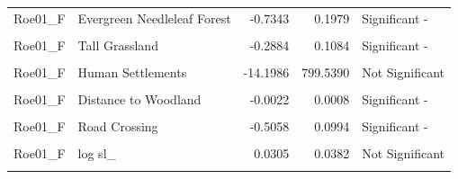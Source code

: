 \documentclass[10pt,a4paper]{article}
\begin{document}
\begin{longtable}[t]{llrrl}
Roe01\_F & Evergreen Needleleaf Forest & -0.7343 & 0.1979 & Significant -\\
\addlinespace
\cellcolor{gray!10}{Roe01\_F} & \cellcolor{gray!10}{Cropland} & \cellcolor{gray!10}{-0.8570} & \cellcolor{gray!10}{0.1910} & \cellcolor{gray!10}{Significant -}\\
Roe01\_F & Tall Grassland & -0.2884 & 0.1084 & Significant -\\
\cellcolor{gray!10}{Roe01\_F} & \cellcolor{gray!10}{Permanent Wetland} & \cellcolor{gray!10}{-13.9667} & \cellcolor{gray!10}{2427.6590} & \cellcolor{gray!10}{Not Significant}\\
Roe01\_F & Human Settlements & -14.1986 & 799.5390 & Not Significant\\
\cellcolor{gray!10}{Roe01\_F} & \cellcolor{gray!10}{Other} & \cellcolor{gray!10}{-14.3647} & \cellcolor{gray!10}{1424.3502} & \cellcolor{gray!10}{Not Significant}\\
\addlinespace
Roe01\_F & Distance to Woodland & -0.0022 & 0.0008 & Significant -\\
\cellcolor{gray!10}{Roe01\_F} & \cellcolor{gray!10}{Distance to Hedges} & \cellcolor{gray!10}{0.0013} & \cellcolor{gray!10}{0.0003} & \cellcolor{gray!10}{Significant +}\\
Roe01\_F & Road Crossing & -0.5058 & 0.0994 & Significant -\\
\cellcolor{gray!10}{Roe01\_F} & \cellcolor{gray!10}{sl\_} & \cellcolor{gray!10}{0.0007} & \cellcolor{gray!10}{0.0002} & \cellcolor{gray!10}{Significant +}\\
Roe01\_F & log sl\_ & 0.0305 & 0.0382 & Not Significant\\
\addlinespace
\cellcolor{gray!10}{Roe01\_F} & \cellcolor{gray!10}{cos ta\_} & \cellcolor{gray!10}{-0.7413} & \cellcolor{gray!10}{0.0372} & \cellcolor{gray!10}{Significant -}\\
\bottomrule
\end{longtable}
\endgroup{}
\end{document}
